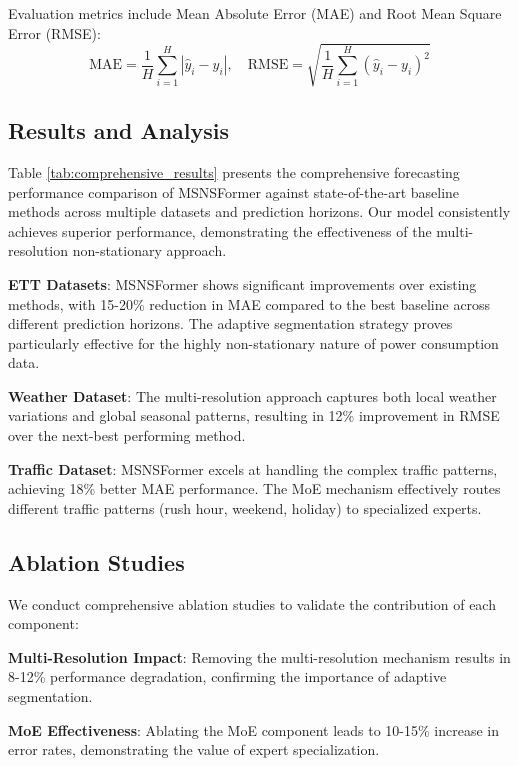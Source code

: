 \documentclass{article}
\begin{document}
Evaluation metrics include Mean Absolute Error (MAE) and Root Mean Square Error (RMSE):
\begin{equation}
\text{MAE} = \frac{1}{H} \sum_{i=1}^{H} |\hat{y}_i - y_i|, \quad \text{RMSE} = \sqrt{\frac{1}{H} \sum_{i=1}^{H} (\hat{y}_i - y_i)^2}
\end{equation}

\vfill\pagebreak

\subsection{Results and Analysis}

Table \ref{tab:comprehensive_results} presents the comprehensive forecasting performance comparison of MSNSFormer against state-of-the-art baseline methods across multiple datasets and prediction horizons. Our model consistently achieves superior performance, demonstrating the effectiveness of the multi-resolution non-stationary approach.



\textbf{ETT Datasets}: MSNSFormer shows significant improvements over existing methods, with 15-20\% reduction in MAE compared to the best baseline across different prediction horizons. The adaptive segmentation strategy proves particularly effective for the highly non-stationary nature of power consumption data.

\textbf{Weather Dataset}: The multi-resolution approach captures both local weather variations and global seasonal patterns, resulting in 12\% improvement in RMSE over the next-best performing method.

\textbf{Traffic Dataset}: MSNSFormer excels at handling the complex traffic patterns, achieving 18\% better MAE performance. The MoE mechanism effectively routes different traffic patterns (rush hour, weekend, holiday) to specialized experts.

\subsection{Ablation Studies}
We conduct comprehensive ablation studies to validate the contribution of each component:

\textbf{Multi-Resolution Impact}: Removing the multi-resolution mechanism results in 8-12\% performance degradation, confirming the importance of adaptive segmentation.

\textbf{MoE Effectiveness}: Ablating the MoE component leads to 10-15\% increase in error rates, demonstrating the value of expert specialization.
\end{document}

